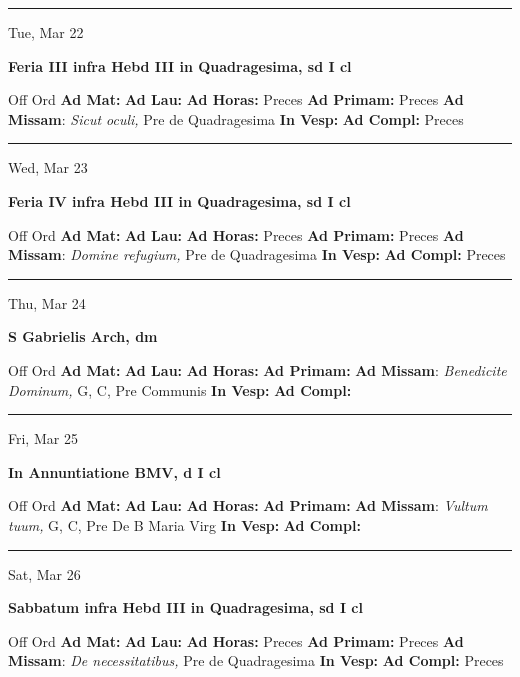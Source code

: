 \documentclass[letterpaper, 10pt]{article}
\begin{document}
\hrule
\begin{center}
Tue, Mar 22
\end{center}\textbf{ \large Feria III infra Hebd III in Quadragesima, \textnormal{\normalsize sd I cl}}
\begin{justify}
Off Ord
\textbf{Ad Mat: }
\textbf{Ad Lau: }
\textbf{Ad Horas: }Preces
\textbf{Ad Primam: }Preces
\textbf{Ad Missam}: \textit{Sicut oculi,} Pre de Quadragesima
\textbf{In Vesp: }
\textbf{Ad Compl: }Preces\end{justify}



\hrule
\begin{center}
Wed, Mar 23
\end{center}\textbf{ \large Feria IV infra Hebd III in Quadragesima, \textnormal{\normalsize sd I cl}}
\begin{justify}
Off Ord
\textbf{Ad Mat: }
\textbf{Ad Lau: }
\textbf{Ad Horas: }Preces
\textbf{Ad Primam: }Preces
\textbf{Ad Missam}: \textit{Domine refugium,} Pre de Quadragesima
\textbf{In Vesp: }
\textbf{Ad Compl: }Preces\end{justify}



\hrule
\begin{center}
Thu, Mar 24
\end{center}\textbf{ \large S Gabrielis Arch, \textnormal{\normalsize dm}}
\begin{justify}
Off Ord
\textbf{Ad Mat: }
\textbf{Ad Lau: }
\textbf{Ad Horas: }
\textbf{Ad Primam: }
\textbf{Ad Missam}: \textit{Benedicite Dominum,} G, C, Pre Communis
\textbf{In Vesp: }
\textbf{Ad Compl: }\end{justify}



\hrule
\begin{center}
Fri, Mar 25
\end{center}\textbf{ \large In Annuntiatione BMV, \textnormal{\normalsize d I cl}}
\begin{justify}
Off Ord
\textbf{Ad Mat: }
\textbf{Ad Lau: }
\textbf{Ad Horas: }
\textbf{Ad Primam: }
\textbf{Ad Missam}: \textit{Vultum tuum,} G, C, Pre De B Maria Virg
\textbf{In Vesp: }
\textbf{Ad Compl: }\end{justify}



\hrule
\begin{center}
Sat, Mar 26
\end{center}\textbf{ \large Sabbatum infra Hebd III in Quadragesima, \textnormal{\normalsize sd I cl}}
\begin{justify}
Off Ord
\textbf{Ad Mat: }
\textbf{Ad Lau: }
\textbf{Ad Horas: }Preces
\textbf{Ad Primam: }Preces
\textbf{Ad Missam}: \textit{De necessitatibus,} Pre de Quadragesima
\textbf{In Vesp: }
\textbf{Ad Compl: }Preces\end{justify}
\end{document}
